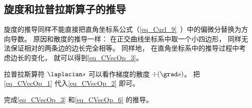 \subsection{旋度和拉普拉斯算子的推导}
旋度的推导同样不能直接把直角坐标系公式（\autoref{eq_Curl_9}~）中的偏微分替换为方向导数。 原因和散度的推导一样： 在正交曲线坐标系中取一个小四边形， 同样无法保证相对的两条边的边长完全相等。 同样地， 在直角坐标系中的推导过程中考虑边长的变化， 就可以得到\autoref{eq_CVecOp_3}。

拉普拉斯算符 $\laplacian s$ 可以看作梯度的散度 $\div (\grad s)$。 把\autoref{eq_CVecOp_1} 代入\autoref{eq_CVecOp_2} 即可。

\begin{exercise}{}
完成\autoref{eq_CVecOp_3} 和\autoref{eq_CVecOp_6} 的推导。
\end{exercise}

